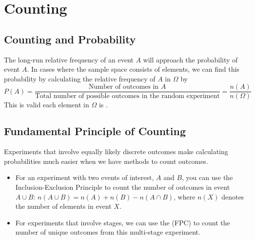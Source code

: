 \chapter{Counting}

\section{Counting and Probability}

\begin{proposition}
    The long-run relative frequency of an event $A$ will approach the probability of event $A$. In cases where the sample space consists of  elements, we can find this probability by calculating the relative frequency of $A$ in $\Omega$ by $$P(A) = \frac{\text{Number of outcomes in } A}{\text{Total number of possible outcomes in the random experiment}} = \frac{n(A)}{n(\Omega)}$$
    This is valid  each element in $\Omega$ is . 
\end{proposition}

\section{Fundamental Principle of Counting}

Experiments that involve equally likely discrete outcomes make calculating probabilities much easier when we have methods to count outcomes.

\begin{itemize}
    \item For an experiment with two events of interest, $A$ and $B$, you can use the Inclusion-Exclusion Principle to count the number of outcomes in event $A \cup B$: $n(A \cup B) = n(A) + n(B) - n(A \cap B)$, where $n(X)$ denotes the number of elements in event $X$. 

    \item For experiments that involve  stages, we can use the  (FPC) to count the number of unique outcomes from this multi-stage experiment. 
\end{itemize}

